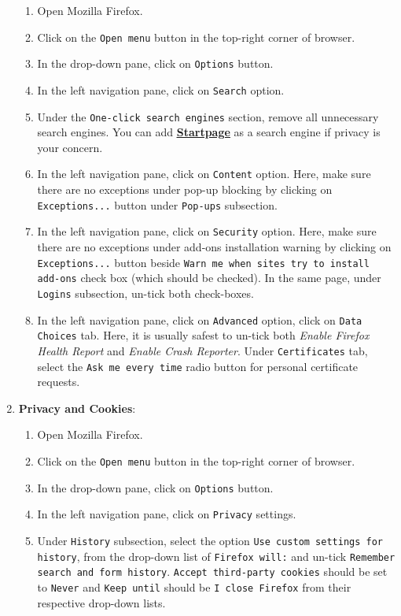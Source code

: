 \documentclass[12pt]{extarticle}
\begin{document}
\begin{enumerate}
	\begin{enumerate}
		\item Open Mozilla Firefox.
		\item Click on the \texttt{Open menu} button in the top-right corner of browser.
		\item In the drop-down pane, click on \texttt{Options} button. 
		\item In the left navigation pane, click on \texttt{Search} option.
		\item Under the \texttt{One-click search engines} section, remove all unnecessary search engines. You can add \href{https://addons.mozilla.org/en-us/firefox/addon/startpage-https-privacy-search/}{\textbf{\underline{Startpage}}} as a search engine if privacy is your concern.
		\item In the left navigation pane, click on \texttt{Content} option. Here, make sure there are no exceptions under pop-up blocking by clicking on \texttt{Exceptions...} button under \texttt{Pop-ups} subsection.
		\item In the left navigation pane, click on \texttt{Security} option. Here, make sure there are no exceptions under add-ons installation warning by clicking on \texttt{Exceptions...} button beside \texttt{Warn me when sites try to install add-ons} check box (which should be checked). In the same page, under \texttt{Logins} subsection, un-tick both check-boxes.
		\item In the left navigation pane, click on \texttt{Advanced} option, click on \texttt{Data Choices} tab. Here, it is usually safest to un-tick both \textit{Enable Firefox Health Report} and \textit{Enable Crash Reporter}. Under \texttt{Certificates} tab, select the \texttt{Ask me every time} radio button for personal certificate requests.
	\end{enumerate}
	
	
	\vspace{2mm}
	\noindent
	\item	\textbf{Privacy and Cookies}:
	
	\begin{enumerate}
		\item Open Mozilla Firefox.
		\item Click on the \texttt{Open menu} button in the top-right corner of browser.
		\item In the drop-down pane, click on \texttt{Options} button. 
		\item In the left navigation pane, click on \texttt{Privacy} settings.
		\item Under \texttt{History} subsection, select the option \texttt{Use custom settings for history}, from the drop-down list of \texttt{Firefox will:} and un-tick \texttt{Remember search and form history}. \texttt{Accept third-party cookies} should be set to \texttt{Never} and \texttt{Keep until} should be \texttt{I close Firefox} from their respective drop-down lists.
		
	\end{enumerate}
	\end{enumerate}
	
\end{document}
